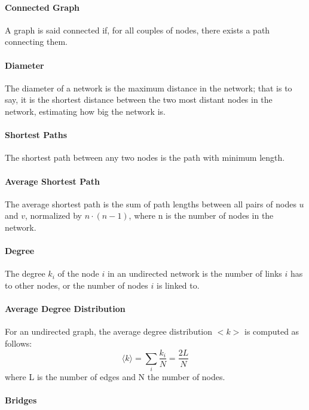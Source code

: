 \documentclass[10pt,twocolumn,letterpaper]{article}
\begin{document}
\paragraph{Connected Graph}

A graph is said connected if, for all couples of nodes, there exists a path connecting them.

\paragraph{Diameter}

The diameter of a network is the maximum distance in the network; that is to say, it is the shortest distance between the two most distant nodes in the network, estimating how big the network is.

\paragraph{Shortest Paths}

The shortest path between any two nodes is the path with minimum length.

\paragraph{Average Shortest Path}

The average shortest path is the sum of path lengths between all pairs of nodes $u$ and $v$, normalized by $n\cdot(n-1)$, where n is the number of nodes in the network.

\paragraph{Degree}

The degree $k_i$ of the node $i$ in an undirected network is the number of links $i$ has to other nodes, or the number of nodes $i$ is linked to.

\paragraph{Average Degree Distribution}

For an undirected graph, the average degree distribution $<k>$ is computed as follows:
$$
\langle k\rangle=\sum_{i} \frac{k_{i}}{N}=\frac{2 L}{N}
$$
where L is the number of edges and N the number of nodes.

\paragraph{Bridges}
\end{document}

